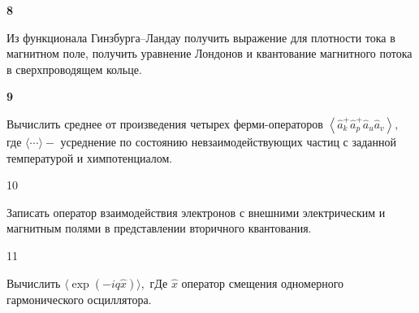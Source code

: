 \documentclass[a4paper,12pt]{article} %
\begin{document}
\begin{task} \textbf{8}



Из функционала Гинзбурга–Ландау получить выражение для плотности тока в магнитном поле, получить уравнение Лондонов и квантование магнитного потока в сверхпроводящем кольце.























\end{task}





\begin{task} \textbf{9}
	
	
Вычислить среднее от произведения четырех ферми-операторов  
$\left\langle\hat{a}_{k}^{+} \hat{a}_{p}^{+} \hat{a}_{u} \hat{a}_{v}\right\rangle,$ 
где $\langle\cdots\rangle-$ усреднение по состоянию невзаимодействующих частиц с заданной температурой и химпотенциалом.











\end{task}


\begin{task}

10

Записать оператор взаимодействия электронов с внешними электрическим и магнитным полями в представлении вторичного квантования.











\end{task}


\begin{task}

11

Вычислить  $\langle\exp (-i q \hat{x})\rangle, \text { гДе } \hat{x}$ оператор смещения одномерного гармонического осциллятора.




\end{task}
\end{document}
